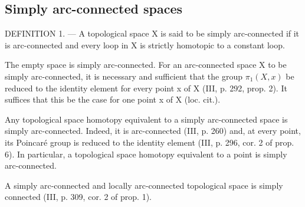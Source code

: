 \subsection{Simply arc-connected spaces}

DEFINITION 1. --- A topological space X is said to be simply arc-connected if it is arc-connected and every loop in X is strictly homotopic to a constant loop.

The empty space is simply arc-connected. For an arc-connected space X to be simply arc-connected, it is necessary and sufficient that the group \(\pi_{1}(X,x)\) be reduced to the identity element for every point x of X (III, p. 292, prop. 2). It suffices that this be the case for one point x of X (loc. cit.).

Any topological space homotopy equivalent to a simply arc-connected space is simply arc-connected. Indeed, it is arc-connected (III, p. 260) and, at every point, its Poincaré group is reduced to the identity element (III, p. 296, cor. 2 of prop. 6). In particular, a topological space homotopy equivalent to a point is simply arc-connected.

A simply arc-connected and locally arc-connected topological space is simply connected (III, p. 309, cor. 2 of prop. 1).
